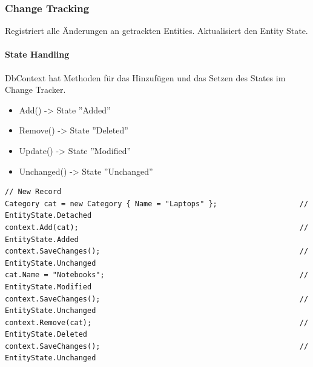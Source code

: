 \documentclass[
a4paper,
oneside,
10pt,
fleqn,
headsepline,
toc=listofnumbered, 
bibliography=totocnumbered]{scrartcl}
\begin{document}
\subsubsection{Change Tracking}
Registriert alle Änderungen an getrackten Entities. Aktualisiert den Entity State.
\paragraph{State Handling} DbContext hat Methoden für das Hinzufügen und das Setzen des States im Change Tracker.
\begin{itemize}
	\item Add() -> State ''Added''
	\item Remove() -> State ''Deleted''
	\item Update() -> State ''Modified''
	\item Unchanged() -> State ''Unchanged''
\end{itemize}
\begin{lstlisting}
// New Record
Category cat = new Category { Name = "Laptops" };                   // EntityState.Detached
context.Add(cat);                                                   // EntityState.Added
context.SaveChanges();                                              // EntityState.Unchanged
cat.Name = "Notebooks";                                             // EntityState.Modified
context.SaveChanges();                                              // EntityState.Unchanged
context.Remove(cat);                                                // EntityState.Deleted
context.SaveChanges();                                              // EntityState.Unchanged
\end{lstlisting}
\end{document}
